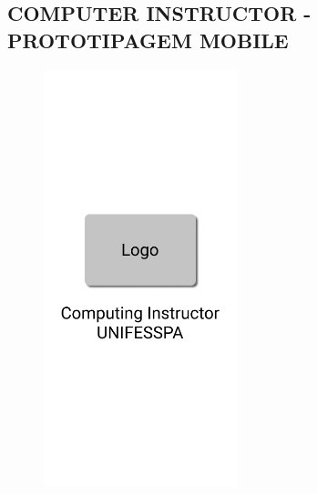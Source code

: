 
\begin{apendicesenv}

\chapter{COMPUTER INSTRUCTOR - PROTOTIPAGEM MOBILE}
\label{chap:apendiceA}


\begin{figure}[H]
    \centering
    \includegraphics[width=0.5\textwidth]{figuras/Apêndice A/Splash creen.png}
\end{figure}



\end{apendicesenv}
